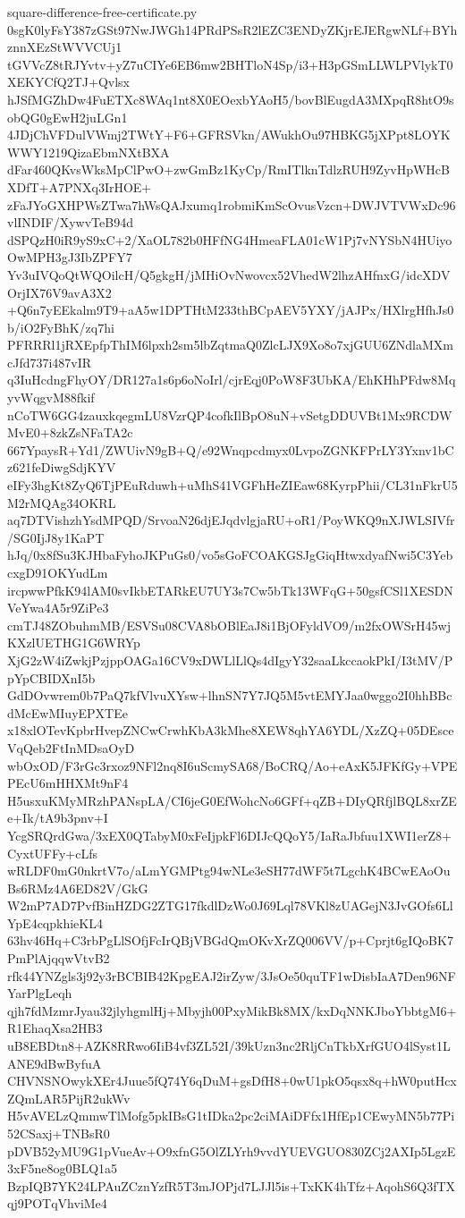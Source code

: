 \documentclass[11pt]{article}
\theoremstyle{definition}
\theoremstyle{remark}
\begin{document}
\begin{filecontents*}[overwrite]{square-difference-free-certificate.py}
0sgK0lyFsY387zGSt97NwJWGh14PRdPSsR2lEZC3ENDyZKjrEJERgwNLf+BYhznnXEzStWVVCUj1
tGVVcZ8tRJYvtv+yZ7uCIYe6EB6mw2BHTloN4Sp/i3+H3pGSmLLWLPVlykT0XEKYCfQ2TJ+Qvlsx
hJSfMGZhDw4FuETXc8WAq1nt8X0EOexbYAoH5/bovBlEugdA3MXpqR8htO9sobQG0gEwH2juLGn1
4JDjChVFDulVWmj2TWtY+F6+GFRSVkn/AWukhOu97HBKG5jXPpt8LOYKWWY1219QizaEbmNXtBXA
dFar460QKvsWksMpClPwO+zwGmBz1KyCp/RmITlknTdlzRUH9ZyvHpWHcBXDfT+A7PNXq3IrHOE+
zFaJYoGXHPWsZTwa7hWsQAJxumq1robmiKmScOvusVzcn+DWJVTVWxDc96vlINDIF/XywvTeB94d
dSPQzH0iR9yS9xC+2/XaOL782b0HFfNG4HmeaFLA01cW1Pj7vNYSbN4HUiyoOwMPH3gJ3IbZPFY7
Yv3uIVQoQtWQOilcH/Q5gkgH/jMHiOvNwovcx52VhedW2lhzAHfnxG/idcXDVOrjIX76V9avA3X2
+Q6n7yEEkalm9T9+aA5w1DPTHtM233thBCpAEV5YXY/jAJPx/HXlrgHfhJs0b/iO2FyBhK/zq7hi
PFRRRl1jRXEpfpThIM6lpxh2sm5lbZqtmaQ0ZlcLJX9Xo8o7xjGUU6ZNdlaMXmcJfd737i487vIR
q3IuHcdngFhyOY/DR127a1s6p6oNoIrl/cjrEqj0PoW8F3UbKA/EhKHhPFdw8MqyvWqgvM88fkif
nCoTW6GG4zauxkqegmLU8VzrQP4cofkIlBpO8uN+vSetgDDUVBt1Mx9RCDWMvE0+8zkZsNFaTA2c
667YpaysR+Yd1/ZWUivN9gB+Q/e92Wnqpcdmyx0LvpoZGNKFPrLY3Yxnv1bCz621feDiwgSdjKYV
eIFy3hgKt8ZyQ6TjPEuRduwh+uMhS41VGFhHeZIEaw68KyrpPhii/CL31nFkrU5M2rMQAg34OKRL
aq7DTVishzhYsdMPQD/SrvoaN26djEJqdvlgjaRU+oR1/PoyWKQ9nXJWLSIVfr/SG0IjJ8y1KaPT
hJq/0x8fSu3KJHbaFyhoJKPuGs0/vo5sGoFCOAKGSJgGiqHtwxdyafNwi5C3YebcxgD91OKYudLm
ircpwwPfkK94lAM0svIkbETARkEU7UY3s7Cw5bTk13WFqG+50gsfCSl1XESDNVeYwa4A5r9ZiPe3
cmTJ48ZObuhmMB/ESVSu08CVA8bOBlEaJ8i1BjOFyldVO9/m2fxOWSrH45wjKXzlUETHG1G6WRYp
XjG2zW4iZwkjPzjppOAGa16CV9xDWLlLlQs4dIgyY32saaLkccaokPkI/I3tMV/PpYpCBIDXnI5b
GdDOvwrem0b7PaQ7kfVlvuXYsw+lhnSN7Y7JQ5M5vtEMYJaa0wggo2I0hhBBcdMcEwMIuyEPXTEe
x18xlOTevKpbrHvepZNCwCrwhKbA3kMhe8XEW8qhYA6YDL/XzZQ+05DEsceVqQeb2FtInMDsaOyD
wbOxOD/F3rGc3rxoz9NFl2nq8I6uScmySA68/BoCRQ/Ao+eAxK5JFKfGy+VPEPEcU6mHHXMt9nF4
H5usxuKMyMRzhPANspLA/CI6jeG0EfWohcNo6GFf+qZB+DIyQRfjlBQL8xrZEe+Ik/tA9b3pnv+I
YcgSRQrdGwa/3xEX0QTabyM0xFeIjpkFl6DIJcQQoY5/IaRaJbfuu1XWI1erZ8+CyxtUFFy+cLfs
wRLDF0mG0nkrtV7o/aLmYGMPtg94wNLe3eSH77dWF5t7LgchK4BCwEAoOuBs6RMz4A6ED82V/GkG
W2mP7AD7PvfBinHZDG2ZTG17fkdlDzWo0J69Lql78VKl8zUAGejN3JvGOfs6LlYpE4cqpkhieKL4
63hv46Hq+C3rbPgLlSOfjFcIrQBjVBGdQmOKvXrZQ006VV/p+Cprjt6gIQoBK7PmPlAjqqwVtvB2
rfk44YNZgls3j92y3rBCBIB42KpgEAJ2irZyw/3JsOe50quTF1wDisbIaA7Den96NFYarPlgLeqh
qjh7fdMzmrJyau32jlyhgmlHj+Mbyjh00PxyMikBk8MX/kxDqNNKJboYbbtgM6+R1EhaqXsa2HB3
uB8EBDtn8+AZK8RRwo6IiB4vf3ZL52I/39kUzn3nc2RljCnTkbXrfGUO4lSyst1LANE9dBwByfuA
CHVNSNOwykXEr4Juue5fQ74Y6qDuM+gsDfH8+0wU1pkO5qsx8q+hW0putHcxZQmLAR5PijR2ukWv
H5vAVELzQmmwTlMofg5pkIBsG1tIDka2pc2ciMAiDFfx1HfEp1CEwyMN5b77Pi52CSaxj+TNBsR0
pDVB52yMU9G1pVueAv+O9xfnG5OlZLYrh9vvdYUEVGUO830ZCj2AXIp5LgzE3xF5ne8og0BLQ1a5
BzpIQB7YK24LPAuZCznYzfR5T3mJOPjd7LJJl5is+TxKK4hTfz+AqohS6Q3fTXqj9POTqVhviMe4

\end{filecontents*}
\end{document}
